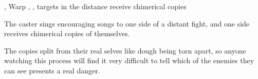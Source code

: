   {\mFire, \mAir}%
  {Warp}%
  {\detailed, \duplicated, \distant}%
  {}%
  { targets in the distance receive chimerical copies}%
  {
    The caster sings encouraging songs to one side of a distant fight, and one side receives chimerical copies of themselves.

    The copies split from their real selves like dough being torn apart, so anyone watching this process will find it very difficult to tell which of the enemies they can see presents a real danger.
  }

